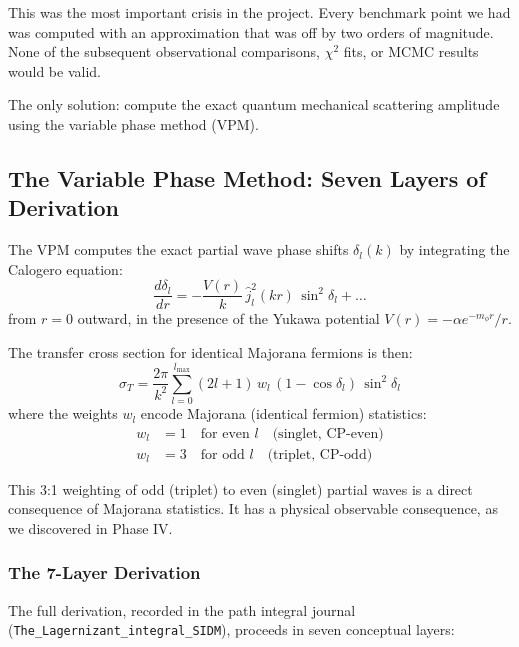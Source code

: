 \documentclass[12pt, a4paper]{article}
\begin{document}
This was the most important crisis in the project. Every benchmark point we had was computed with an approximation that was off by two orders of magnitude. None of the subsequent observational comparisons, $\chi^2$ fits, or MCMC results would be valid.

The only solution: compute the exact quantum mechanical scattering amplitude using the variable phase method (VPM).

\subsection{The Variable Phase Method: Seven Layers of Derivation}

The VPM computes the exact partial wave phase shifts $\delta_l(k)$ by integrating the Calogero equation:
\begin{equation}
  \frac{d\delta_l}{dr} = -\frac{V(r)}{k}\,\hat{j}_l^2(kr)\,\sin^2\delta_l + \ldots
\end{equation}
from $r = 0$ outward, in the presence of the Yukawa potential $V(r) = -\alpha e^{-m_\phi r}/r$.

The transfer cross section for identical Majorana fermions is then:
\begin{equation}
  \sigma_T = \frac{2\pi}{k^2}\sum_{l=0}^{l_\text{max}} (2l+1)\,w_l\,(1 - \cos\delta_l)\,\sin^2\delta_l
\end{equation}
where the weights $w_l$ encode Majorana (identical fermion) statistics:
\begin{align}
  w_l &= 1 \quad \text{for even } l \quad \text{(singlet, CP-even)} \\
  w_l &= 3 \quad \text{for odd } l \quad \text{(triplet, CP-odd)}
\end{align}

This 3:1 weighting of odd (triplet) to even (singlet) partial waves is a direct consequence of Majorana statistics. It has a physical observable consequence, as we discovered in Phase IV.

\subsubsection{The 7-Layer Derivation}

The full derivation, recorded in the path integral journal (\texttt{The\_Lagernizant\_integral\_SIDM}), proceeds in seven conceptual layers:
\end{document}
